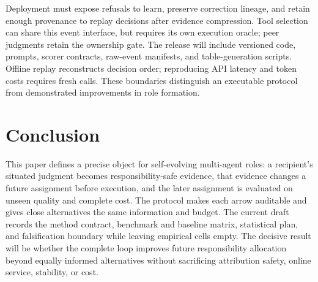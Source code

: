 \documentclass[sigconf,anonymous]{aamas}
\begin{document}
Deployment must expose refusals to learn, preserve correction lineage, and retain enough provenance to replay decisions after evidence compression. Tool selection can share this event interface, but requires its own execution oracle; peer judgments retain the ownership gate. The release will include versioned code, prompts, scorer contracts, raw-event manifests, and table-generation scripts. Offline replay reconstructs decision order; reproducing API latency and token costs requires fresh calls. These boundaries distinguish an executable protocol from demonstrated improvements in role formation.

\section{Conclusion}

This paper defines a precise object for self-evolving multi-agent roles: a recipient's situated judgment becomes responsibility-safe evidence, that evidence changes a future assignment before execution, and the later assignment is evaluated on unseen quality and complete cost. The protocol makes each arrow auditable and gives close alternatives the same information and budget. The current draft records the method contract, benchmark and baseline matrix, statistical plan, and falsification boundary while leaving empirical cells empty. The decisive result will be whether the complete loop improves future responsibility allocation beyond equally informed alternatives without sacrificing attribution safety, online service, stability, or cost.

\clearpage


\end{document}
